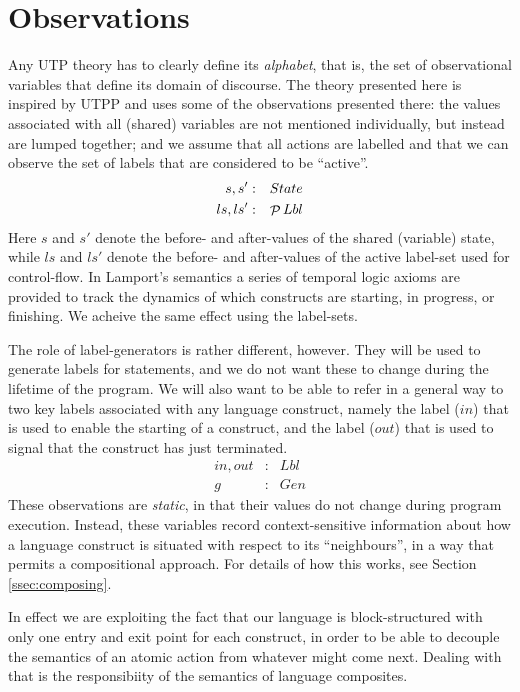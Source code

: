 \section{Observations}\label{sec:observe}

Any UTP theory has to clearly define its \emph{alphabet},
that is, the set of observational variables that define
its domain of discourse.
The theory presented here is inspired by UTPP\cite{DBLP:conf/icfem/WoodcockH02}
and uses some of the observations presented there:
the values associated with all (shared) variables
are not mentioned individually, but instead are lumped together;
and we assume that all actions are labelled and that we can observe
the set of labels that are considered to be ``active''.
\begin{eqnarray}
   s, s' &:& State
\\ ls, ls' &:& \mathop{\mathcal P} Lbl
\end{eqnarray}
Here $s$ and $s'$ denote the before- and after-values of the
shared (variable) state,
while $ls$ and $ls'$ denote the before- and after-values of the
active label-set used for control-flow.
In Lamport's semantics\cite{Lamport1985} a series of temporal logic axioms are provided
to track the dynamics of which constructs are starting,
in progress, or finishing.
We acheive the same effect using the label-sets.

The role of label-generators is rather different, however.
They will be used to generate labels for statements,
and we do not want these to change during the lifetime of the program.
We will also want to be able to refer in a general way to two key labels
associated with any language construct,
namely the label ($in$) that is used to enable the starting of a construct,
and the label ($out$) that is used to signal that the construct has just terminated.
\begin{eqnarray}
   in, out &:& Lbl
\\ g &:& Gen
\end{eqnarray}
These observations are \emph{static},
in that their values do not change during program execution.
Instead, these variables record context-sensitive information about
how a language construct is situated with respect to its ``neighbours'',
in a way that permits a compositional approach.
For details of how this works, see Section \ref{ssec:composing}.


In effect we are exploiting the fact that our language is block-structured
with only one entry and exit point for each construct,
in order to be able to decouple the semantics of an atomic action
from whatever might come next.
Dealing with that is the responsibiity of the semantics of language composites.


